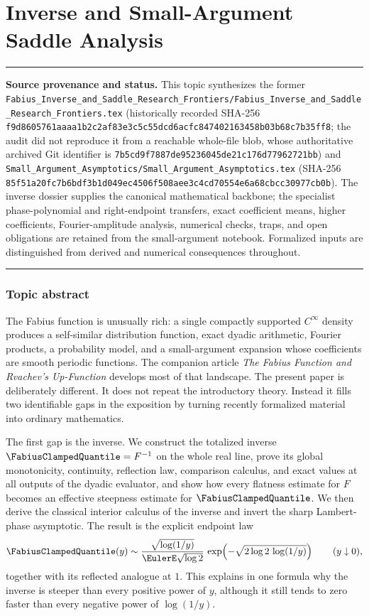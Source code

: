 \documentclass[11pt,oneside]{article}
\theoremstyle{definition}
\theoremstyle{remark}
\newenvironment{boxedremark}{%
  \par\smallskip\noindent\begin{center}\begin{minipage}{0.94\textwidth}%
  \color{black}\hrule\vspace{0.6em}\small
}{%
  \vspace{0.6em}\hrule\end{minipage}\end{center}\smallskip
}
\begin{document}
\part{Inverse and Small-Argument Saddle Analysis}
\label{part:inverse}
\begin{boxedremark}
\textbf{Source provenance and status.} This topic synthesizes the former
\nolinkurl{Fabius_Inverse_and_Saddle_Research_Frontiers/Fabius_Inverse_and_Saddle_Research_Frontiers.tex}
(historically recorded SHA-256 \nolinkurl{f9d8605761aaaa1b2c2af83e3c5c55dcd6acfc847402163458b03b68c7b35ff8};
the audit did not reproduce it from a reachable whole-file blob, whose authoritative archived
Git identifier is \nolinkurl{7b5cd9f7887de95236045de21c176d77962721bb})
and \nolinkurl{Small_Argument_Asymptotics/Small_Argument_Asymptotics.tex}
(SHA-256 \nolinkurl{85f51a20fc7b6bdf3b1d049ec4506f508aee3c4cd70554e6a68cbcc30977cb0b}).
The inverse dossier supplies the canonical mathematical backbone; the specialist
phase-polynomial and right-endpoint transfers, exact coefficient means, higher coefficients,
Fourier-amplitude analysis, numerical checks, traps, and open obligations are retained from
the small-argument notebook.  Formalized inputs are distinguished from
derived and numerical consequences throughout.
\end{boxedremark}
\section*{Topic abstract}
The Fabius function is unusually rich: a single compactly supported
$C^\infty$ density produces a self-similar distribution function, exact
dyadic arithmetic, Fourier products, a probability model, and a
small-argument expansion whose coefficients are smooth periodic functions.
The companion article \emph{The Fabius Function and Rvachev's Up-Function}
develops most of that landscape.  The present paper is deliberately
different.  It does not repeat the introductory theory.  Instead it fills
two identifiable gaps in the exposition by turning recently formalized
material into ordinary mathematics.

The first gap is the inverse.  We construct the totalized inverse
$\FabiusClampedQuantile=F^{-1}$ on the whole real line, prove its global monotonicity,
continuity, reflection law, comparison calculus, and exact values at all
outputs of the dyadic evaluator, and show how every flatness estimate for
$F$ becomes an effective steepness estimate for $\FabiusClampedQuantile$.  We then derive
the classical interior calculus of the inverse and invert the sharp
Lambert-phase asymptotic.  The result is the explicit endpoint law
\[
 \FabiusClampedQuantile(y)\sim
 \frac{\sqrt{\log(1/y)}}{\EulerE\sqrt{\log 2}}\,
 \exp\!\left(-\sqrt{2\log 2\,\log(1/y)}\right)
 \qquad (y\downarrow0),
\]
together with its reflected analogue at $1$.  This explains in one formula
why the inverse is steeper than every positive power of $y$, although it
still tends to zero faster than every negative power of $\log(1/y)$.
\end{document}
